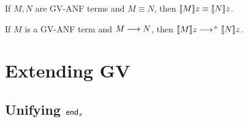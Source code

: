 \documentclass[orivec,envcountsame]{llncs}
\begin{document}
\begin{theorem}
  If $M, N$ are GV-ANF terms and $M \equiv N$, then $\llbracket M \rrbracket z \equiv \llbracket N \rrbracket z$.
\end{theorem}

\begin{theorem}
  If $M$ is a GV-ANF term and $M \longrightarrow N$, then $\llbracket M \rrbracket z \longrightarrow^+ \llbracket N \rrbracket z$.
\end{theorem}

\section{Extending GV}

\subsection{Unifying $\mathsf{end}_x$}
\end{document}
